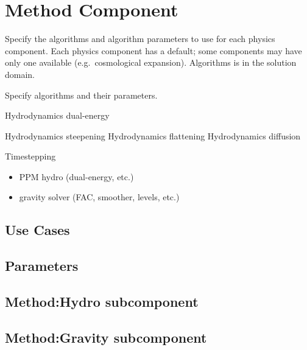 \section{Method Component} \label{s:component-method}

 Specify the algorithms and algorithm parameters
 to use for each physics component.  Each physics component has a
 default; some components may have only one available
 (e.g.~cosmological expansion).  Algorithms is in the solution domain.

Specify algorithms and their parameters.

Hydrodynamics dual-energy

Hydrodynamics steepening
Hydrodynamics flattening
Hydrodynamics diffusion

Timestepping


\begin{itemize}
\item PPM hydro (dual-energy, etc.)
\item gravity solver (FAC, smoother, levels, etc.)
\end{itemize}

\subsection{Use Cases}
\subsection{Parameters}

\subsection{Method:Hydro subcomponent}

\subsection{Method:Gravity subcomponent}


